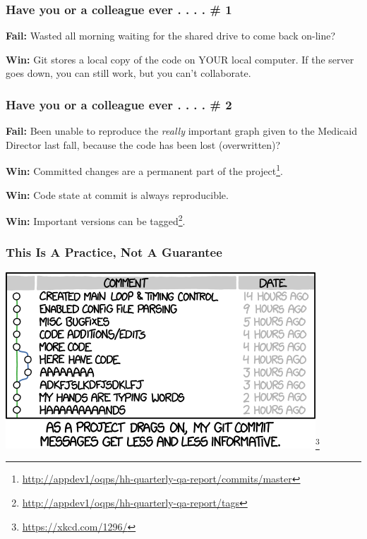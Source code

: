 \documentclass{beamer}
\begin{document}
\begin{frame} %
  \frametitle{Have you or a colleague ever . . . . \# 1} 
 
  \textbf{Fail:} Wasted all morning waiting for the shared drive to
  come back on-line?
 
  \medskip 
  \noindent\makebox[\linewidth]{\rule{\textwidth}{0.4pt}}
  \medskip

  \textbf{Win:} Git stores a local copy of the code on YOUR local
  computer. If the server goes down, you can still work, but you can't
  collaborate.
  
\end{frame}
 
\begin{frame} %
  \frametitle{Have you or a colleague ever . . . . \# 2} 

  \textbf{Fail:} Been unable to reproduce the \emph{really} important
  graph given to the Medicaid Director last fall, because the code has
  been lost (overwritten)?

  \medskip 
  \noindent\makebox[\linewidth]{\rule{\textwidth}{0.4pt}}
  \medskip

  \textbf{Win:} Committed changes are a permanent part of the project\footnote{\url{http://appdev1/oqps/hh-quarterly-qa-report/commits/master}}.
  
  \medskip
  \textbf{Win:} Code state at commit is always reproducible.

  \medskip
  \textbf{Win:} Important versions can be tagged\footnote{\url{http://appdev1/oqps/hh-quarterly-qa-report/tags}}.
  
\end{frame}

\begin{frame}
  \frametitle{This Is A Practice, Not A Guarantee}
  \includegraphics[width=\textwidth]{./img/git_commit.png}\footnote{\url{https://xkcd.com/1296/}}
\end{frame}
 
\end{document}
